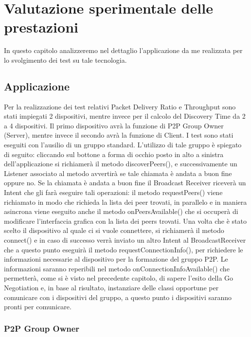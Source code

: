 \chapter{Valutazione sperimentale delle prestazioni}
In questo capitolo analizzeremo nel dettaglio l'applicazione da me realizzata per lo svolgimento dei test su tale tecnologia.

\section{Applicazione}
Per la realizzazione dei test relativi Packet Delivery Ratio e Throughput sono stati impiegati 2 dispositivi, mentre invece per il calcolo del Discovery Time da 2 a 4 dispositivi.
Il primo dispositivo avrà la funzione di P2P Group Owner (Server), mentre invece il secondo avrà la funzione di Client.
I test sono stati eseguiti con l'ausilio di un gruppo standard.
L'utilizzo di tale gruppo è spiegato di seguito: cliccando sul bottone a forma di occhio posto in alto a sinistra dell'applicazione si richiamerà il metodo discoverPeers(), e successivamente un Listener associato al metodo avvertirà se tale chiamata è andata a buon fine oppure no.
Se la chiamata è andata a buon fine il Broadcast Receiver riceverà un Intent che gli farà eseguire tali operazioni:
il metodo requestPeers() viene richiamato in modo che richieda la lista dei peer trovati, in parallelo e in maniera asincrona viene eseguito anche il metodo onPeersAvailable() che si occuperà di modificare l'interfaccia grafica con la lista dei peers trovati.
Una volta che è stato scelto il dispositivo al quale ci si vuole connettere, si richiamerà il metodo connect() e in caso di successo verrà inviato un altro Intent al BroadcastReceiver che a questo punto eseguirà il metodo requestConnectionInfo(), per richiedere le informazioni necessarie al dispositivo per la formazione del gruppo P2P. 
Le informazioni saranno reperibili nel metodo onConnectionInfoAvailable() che permetterà, come si è visto nel
precedente capitolo, di sapere l’esito della Go Negotiation e, in base al risultato, instanziare delle classi opportune per comunicare con i dispositivi del gruppo, a questo punto i dispositivi saranno pronti per comunicare.

\subsection{P2P Group Owner}

